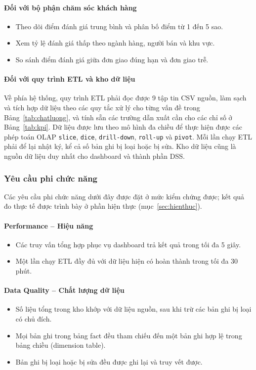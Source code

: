 \paragraph{Đối với bộ phận chăm sóc khách hàng}
\begin{itemize}
\item Theo dõi điểm đánh giá trung bình và phân bố điểm từ 1 đến 5 sao.
\item Xem tỷ lệ đánh giá thấp theo ngành hàng, người bán và khu vực.
\item So sánh điểm đánh giá giữa đơn giao đúng hạn và đơn giao trễ.
\end{itemize}

\paragraph{Đối với quy trình ETL và kho dữ liệu}
Về phía hệ thống, quy trình ETL phải đọc được 9 tập tin CSV nguồn, làm sạch và tích hợp dữ liệu theo các quy tắc xử lý cho từng vấn đề trong Bảng~\ref{tab:chatluong}, và tính sẵn các trường dẫn xuất cần cho các chỉ số ở Bảng~\ref{tab:kpi}. Dữ liệu được lưu theo mô hình đa chiều để thực hiện được các phép toán OLAP \texttt{slice}, \texttt{dice}, \texttt{drill-down}, \texttt{roll-up} và \texttt{pivot}. Mỗi lần chạy ETL phải để lại nhật ký, kể cả số bản ghi bị loại hoặc bị sửa. Kho dữ liệu cũng là nguồn dữ liệu duy nhất cho dashboard và thành phần DSS.

\subsubsection{Yêu cầu phi chức năng}

Các yêu cầu phi chức năng dưới đây được đặt ở mức kiểm chứng được; kết quả đo thực tế được trình bày ở phần hiện thực (mục~\ref{sec:hienthuc}).

\paragraph{Performance -- Hiệu năng}
\begin{itemize}
\item Các truy vấn tổng hợp phục vụ dashboard trả kết quả trong tối đa 5 giây.
\item Một lần chạy ETL đầy đủ với dữ liệu hiện có hoàn thành trong tối đa 30 phút.
\end{itemize}

\paragraph{Data Quality -- Chất lượng dữ liệu}
\begin{itemize}
\item Số liệu tổng trong kho khớp với dữ liệu nguồn, sau khi trừ các bản ghi bị loại có chủ đích.
\item Mọi bản ghi trong bảng fact đều tham chiếu đến một bản ghi hợp lệ trong bảng chiều (dimension table).
\item Bản ghi bị loại hoặc bị sửa đều được ghi lại và truy vết được.
\end{itemize}

